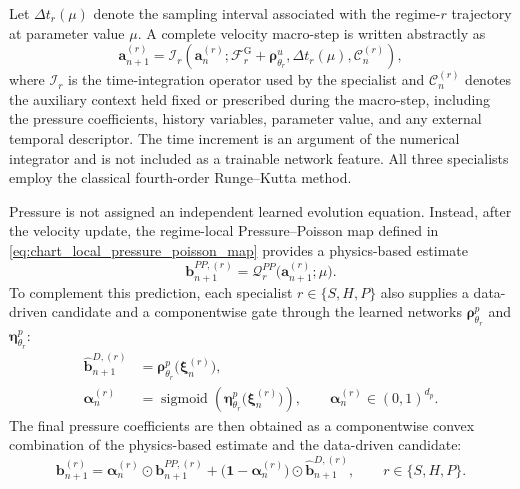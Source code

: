 Let $\Delta t_r(\mu)$ denote the sampling interval associated with the
regime-$r$ trajectory at parameter value $\mu$.  A complete velocity
macro-step is written abstractly as
\begin{equation}
  \boldsymbol{a}^{(r)}_{n+1}
  =
  \mathcal{I}_{r}
  \left(
    \boldsymbol{a}^{(r)}_{n};
    \mathscr{F}^{\mathrm{G}}_r
    +\boldsymbol{\rho}^{u}_{\theta_r},
    \Delta t_r(\mu),
    \mathcal{C}^{(r)}_n
  \right),
  \label{eq:native_velocity_integrator}
\end{equation}
where $\mathcal{I}_{r}$ is the time-integration operator used by the
specialist and $\mathcal{C}^{(r)}_n$ denotes the auxiliary context held fixed
or prescribed during the macro-step, including the pressure coefficients,
history variables, parameter value, and any external temporal descriptor.
The time increment is an argument of the numerical integrator and is not
included as a trainable network feature.  All three specialists employ the classical fourth-order Runge–Kutta method.

Pressure is not assigned an independent learned evolution equation.
Instead, after the velocity update, the regime-local Pressure--Poisson map
defined in \eqref{eq:chart_local_pressure_poisson_map} provides a
physics-based estimate
\begin{equation}
  \boldsymbol{b}^{PP,(r)}_{n+1}
  =
  \mathscr{Q}^{PP}_{r}
  \bigl(
    \boldsymbol{a}^{(r)}_{n+1};
    \mu
  \bigr).
  \label{eq:pressure_poisson_base}
\end{equation}
To complement this prediction, each specialist $r\in\{S,H,P\}$ also
supplies a data-driven candidate and a componentwise gate through the
learned networks $\boldsymbol{\rho}^{p}_{\theta_r}$ and
$\boldsymbol{\eta}^{p}_{\theta_r}$:
\begin{align}
  \widehat{\boldsymbol{b}}^{D,(r)}_{n+1}
  &=
  \boldsymbol{\rho}^{p}_{\theta_r}
  \bigl(
    \boldsymbol{\xi}^{(r)}_n
  \bigr),
  \label{eq:data_driven_pressure_candidate}\\
  \boldsymbol{\alpha}^{(r)}_n
  &=
  \operatorname{sigmoid}
  \left(
    \boldsymbol{\eta}^{p}_{\theta_r}
    \bigl(
      \boldsymbol{\xi}^{(r)}_n
    \bigr)
  \right),
  \qquad
  \boldsymbol{\alpha}^{(r)}_n\in(0,1)^{d_p}.
  \label{eq:adaptive_pressure_gate}
\end{align}
The final pressure coefficients are then obtained as a componentwise
convex combination of the physics-based estimate and the data-driven
candidate:
\begin{equation}
  \boldsymbol{b}^{(r)}_{n+1}
  =
  \boldsymbol{\alpha}^{(r)}_n
  \odot
  \boldsymbol{b}^{PP,(r)}_{n+1}
  +
  \bigl(
    \boldsymbol{1}-\boldsymbol{\alpha}^{(r)}_n
  \bigr)
  \odot
  \widehat{\boldsymbol{b}}^{D,(r)}_{n+1},
  \qquad
  r\in\{S,H,P\}.
  \label{eq:adaptive_pressure_closure}
\end{equation}


